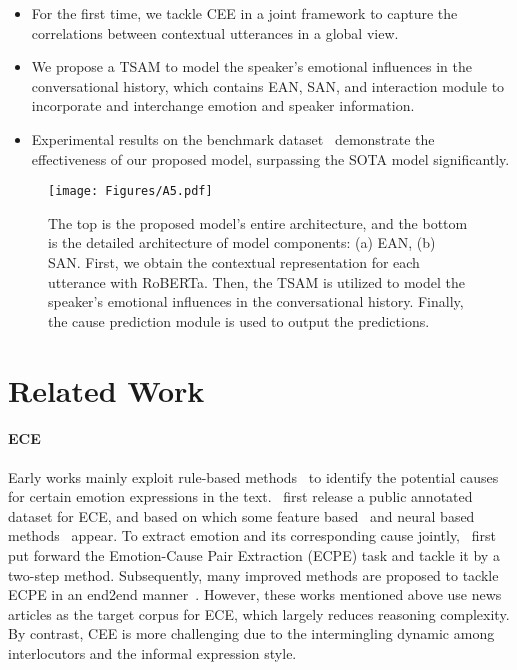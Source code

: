 \documentclass[11pt]{article}
\begin{document}
\begin{itemize}
\item For the first time, we tackle CEE in a joint framework to capture the correlations between contextual utterances in a global view.
\item We propose a TSAM to model the speaker's emotional influences in the conversational history, which contains EAN, SAN, and interaction module to incorporate and interchange emotion and speaker information.
\item Experimental results on the benchmark dataset~\citep{poria2021recognizing} demonstrate the effectiveness of our proposed model, surpassing the SOTA model significantly.
\end{itemize}

\begin{figure*}[htbp]
	\centering  \texttt{[image: Figures/A5.pdf]}
\caption{The top is the proposed model's entire architecture, and the bottom is the detailed architecture of model components: (a) EAN, (b) SAN. First, we obtain the contextual representation for each utterance with RoBERTa. Then, the TSAM is utilized to model the speaker's emotional influences in the conversational history. Finally, the cause prediction module is used to output the predictions.
	}\label{fig-2}

\end{figure*}


\section{Related Work}
\paragraph{ECE} Early works mainly exploit rule-based methods~\citep{lee2010text,lee2010emotion,chen2010emotion} to identify the potential causes for certain emotion expressions in the text.~\citet{gui2016event} first release a public annotated dataset for ECE, and based on which some feature based~\citep{gui2016emotion} and neural based methods~\citep{gui2017question,li2018co,ding2019independent,DBLP:conf/ijcai/XiaZD19,DBLP:conf/acl/Yan0PH20,li2021boundary} appear. To extract emotion and its corresponding cause jointly,~\citet{xia2019emotion} first put forward the Emotion-Cause Pair Extraction (ECPE) task and tackle it by a two-step method. Subsequently, many improved methods are proposed to tackle ECPE in an end2end manner~\citep{ding2020ecpe,ding2020end,yuan2020emotion,fan2020transition,wei2020effective,cheng2020symmetric,chen2020unified,chen2020end}. However, these works mentioned above use news articles as the target corpus for ECE, which largely reduces reasoning complexity. By contrast, 
CEE is more challenging due to the intermingling dynamic among interlocutors and the informal expression style.
\end{document}
